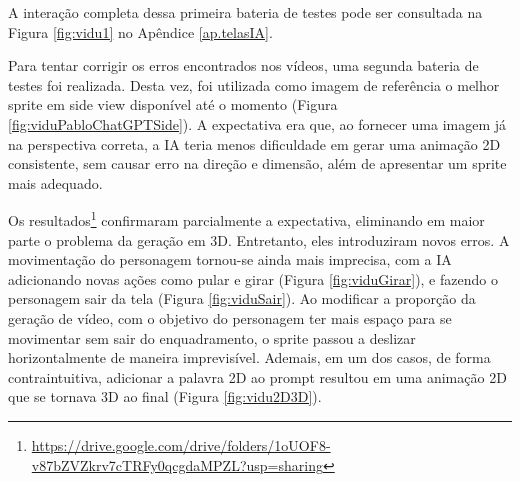 A interação completa dessa primeira bateria de testes pode ser consultada na Figura \ref{fig:vidu1} no Apêndice \ref{ap.telasIA}.

Para tentar corrigir os erros encontrados nos vídeos, uma segunda bateria de testes foi realizada. Desta vez, foi utilizada como imagem de referência o melhor sprite em side view disponível até o momento (Figura \ref{fig:viduPabloChatGPTSide}). A expectativa era que, ao fornecer uma imagem já na perspectiva correta, a IA teria menos dificuldade em gerar uma animação 2D consistente, sem causar erro na direção e dimensão, além de apresentar um sprite mais adequado.

Os resultados\footnote{\url{https://drive.google.com/drive/folders/1oUOF8-v87bZVZkrv7cTRFy0qcgdaMPZL?usp=sharing}} confirmaram parcialmente a expectativa, eliminando em maior parte o problema da geração em 3D. Entretanto, eles introduziram novos erros. A movimentação do personagem tornou-se ainda mais imprecisa, com a IA adicionando novas ações como pular e girar (Figura \ref{fig:viduGirar}), e fazendo o personagem sair da tela (Figura \ref{fig:viduSair}). Ao modificar a proporção da geração de vídeo, com o objetivo do personagem ter mais espaço para se movimentar sem sair do enquadramento, o sprite passou a deslizar horizontalmente de maneira imprevisível. Ademais, em um dos casos, de forma contraintuitiva, adicionar a palavra 2D ao prompt resultou em uma animação 2D que se tornava 3D ao final (Figura \ref{fig:vidu2D3D}). 


